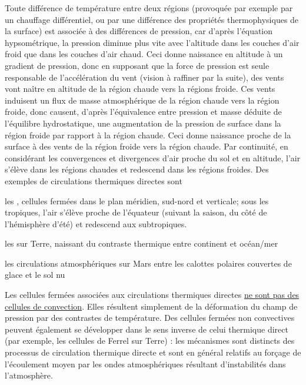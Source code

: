 \sk
Toute différence de température entre deux régions (provoquée par exemple par un chauffage différentiel, ou par une différence des propriétés thermophysiques de la surface) est associée à des différences de pression, car d'après l'équation hypsométrique, 
la pression diminue plus vite avec l'altitude dans les couches d'air froid que dans les couches d'air chaud. Ceci donne naissance en altitude à un gradient de pression, donc en supposant que la force de pression est seule responsable de l'accélération du vent (vision à raffiner par la suite), des vents vont naître en altitude de la région chaude vers la régions froide. Ces vents induisent un flux de masse atmosphérique de la région chaude vers la région froide, donc causent, d'après l'équivalence entre pression et masse déduite de l'équilibre hydrostatique, une augmentation de la pression de surface dans la région froide par rapport à la région chaude. Ceci donne naissance proche de la surface à des vents de la région froide vers la région chaude. Par continuité, en considérant les convergences et divergences d'air proche du sol et en altitude, l'air s'élève dans les régions chaudes et redescend dans les régions froides.
%
Des exemples de circulations thermiques directes sont
\begin{citemize}
\item les , cellules fermées dans le plan méridien, sud-nord et verticale; sous les tropiques, l'air s'élève proche de l'équateur (suivant la saison, du côté de l'hémisphère d'été) et redescend aux subtropiques.
\item les  sur Terre, naissant du contraste thermique entre continent et océan/mer
\item les circulations atmosphériques sur Mars entre les calottes polaires couvertes de glace et le sol nu
\end{citemize}

\sk
Les cellules fermées associées aux circulations thermiques directes \underline{ne sont pas des cellules de convection}. Elles résultent simplement de la déformation du champ de pression par des contrastes de température. Des cellules fermées non convectives peuvent également se développer dans le sens inverse de celui thermique direct (par exemple, les cellules de Ferrel sur Terre) : les mécanismes sont distincts des processus de circulation thermique directe et sont en général relatifs au forçage de l'écoulement moyen par les ondes atmosphériques résultant d'instabilités dans l'atmosphère.



